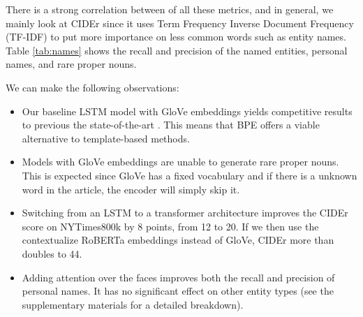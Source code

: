 There is a strong correlation between of all these metrics, and in general, we
mainly look at CIDEr since it uses Term Frequency Inverse Document Frequency
(TF-IDF) to put more importance on less common words such as entity names.
Table \ref{tab:names} shows the recall and precision of the named entities,
personal names, and rare proper nouns.

We can make the following observations:

\begin{itemize}
   \item Our baseline LSTM model with GloVe embeddings yields competitive
   results to previous the state-of-the-art \cite{Biten2019GoodNews}. This
   means that BPE offers a viable alternative to template-based methods.

   \item Models with GloVe embeddings are unable to generate rare proper nouns.
   This is expected since GloVe has a fixed vocabulary and if there is a
   unknown word in the article, the encoder will simply skip it.

   \item Switching from an LSTM to a transformer architecture improves the
   CIDEr score on NYTimes800k by 8 points, from 12 to 20. If we then use the
   contextualize RoBERTa embeddings instead of GloVe, CIDEr more than doubles
   to 44.

   \item Adding attention over the faces improves both the recall and precision
   of personal names. It has no significant effect on other entity types (see
   the supplementary materials for a detailed breakdown).
\end{itemize}

